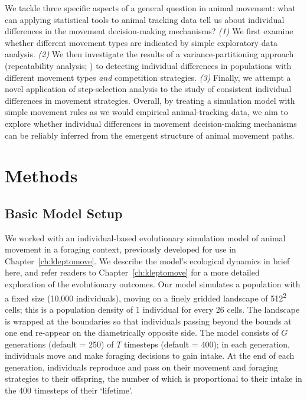     We tackle three specific aspects of a general question in animal movement: what can applying statistical tools to animal tracking data tell us about individual differences in the movement decision-making mechanisms?
    \textit{(1)} We first examine whether different movement types are indicated by simple exploratory data analysis.
    \textit{(2)} We then investigate the results of a variance-partitioning approach (repeatability analysis; \citealt{nakagawa2010,hertel2019}) to detecting individual differences in populations with different movement types \textit{and} competition strategies.
    \textit{(3)} Finally, we attempt a novel application of step-selection analysis to the study of consistent individual differences in movement strategies.
    Overall, by treating a simulation model with simple movement rules as we would empirical animal-tracking data, we aim to explore whether individual differences in movement decision-making mechanisms can be reliably inferred from the emergent structure of animal movement paths.
    
    \section*{Methods}
    
    \subsection*{Basic Model Setup}
    
    We worked with an individual-based evolutionary simulation model of animal movement in a foraging context, previously developed for use in Chapter~\ref{ch:kleptomove}.
    We describe the model's ecological dynamics in brief here, and refer readers to Chapter~\ref{ch:kleptomove} for a more detailed exploration of the evolutionary outcomes.    
    Our model simulates a population with a fixed size (10,000 individuals), moving on a finely gridded landscape of 512\textsuperscript{2} cells; this is a population density of 1 individual for every 26 cells.
    The landscape is wrapped at the boundaries so that individuals passing beyond the bounds at one end re-appear on the diametrically opposite side.
    The model consists of $G$ generations (default = 250) of $T$ timesteps (default = 400); in each generation, individuals move and make foraging decisions to gain intake.
    At the end of each generation, individuals reproduce and pass on their movement and foraging strategies to their offspring, the number of which is proportional to their intake in the 400 timesteps of their `lifetime'.
    
